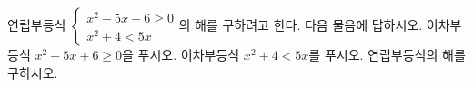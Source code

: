 연립부등식 $\begin{cases} x^2-5x+6\ge 0 \\ x^2+4<5x \end{cases}$의 해를 구하려고 한다. 다음 물음에 답하시오.
 이차부등식 $x^2-5x+6\ge 0$을 푸시오.
 이차부등식 $x^2+4<5x$를 푸시오.
 연립부등식의 해를 구하시오.
